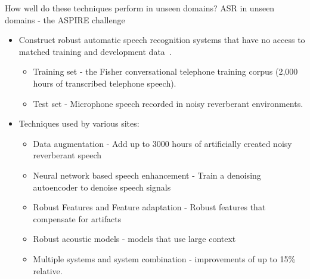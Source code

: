 \begin{frame} {How well do these techniques perform in unseen domains?}
{ASR in unseen domains - the ASPIRE challenge}

\begin{itemize}
\item Construct robust automatic speech recognition systems that \alert{have no access to matched training and
development data}~\cite{harper2015automatic}.
\begin{itemize}
\item \alert{Training set}  - the Fisher conversational telephone training corpus (2,000 hours of transcribed telephone speech).
\item \alert{Test set} - Microphone speech recorded in noisy reverberant environments.
\end{itemize}
\item Techniques used by various sites:
\begin{itemize}
\item Data augmentation - Add up to 3000 hours of artificially created noisy reverberant speech
\item Neural network based speech enhancement - Train a denoising autoencoder to denoise speech signals
\item Robust Features and Feature adaptation - Robust features that compensate for artifacts
\item Robust acoustic models - models that use large context
\item Multiple systems and system combination - improvements of up to 15\% relative.
\end{itemize}
\end{itemize}
\end{frame}

